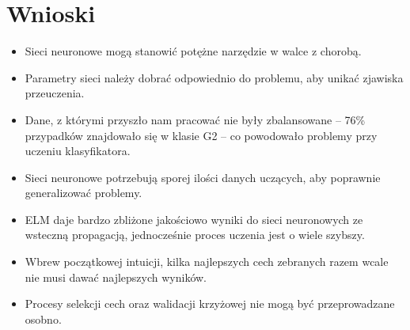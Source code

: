 \chapter{Wnioski}

\begin{itemize}
	\item{Sieci neuronowe mogą stanowić potężne narzędzie w walce z chorobą.}
	\item{Parametry sieci należy dobrać odpowiednio do problemu, aby unikać zjawiska przeuczenia.}
	\item{Dane, z którymi przyszło nam pracować nie były zbalansowane -- 76\% przypadków znajdowało się w klasie G2 -- co powodowało problemy przy uczeniu klasyfikatora.}
	\item{Sieci neuronowe potrzebują sporej ilości danych uczących, aby poprawnie generalizować problemy.}
	\item{ELM daje bardzo zbliżone jakościowo wyniki do sieci neuronowych ze wsteczną propagacją, jednocześnie proces uczenia jest o wiele szybszy.}
	\item{Wbrew początkowej intuicji, kilka najlepszych cech zebranych razem wcale nie musi dawać najlepszych wyników.}
	\item{Procesy selekcji cech oraz walidacji krzyżowej nie mogą być przeprowadzane osobno.}
\end{itemize}